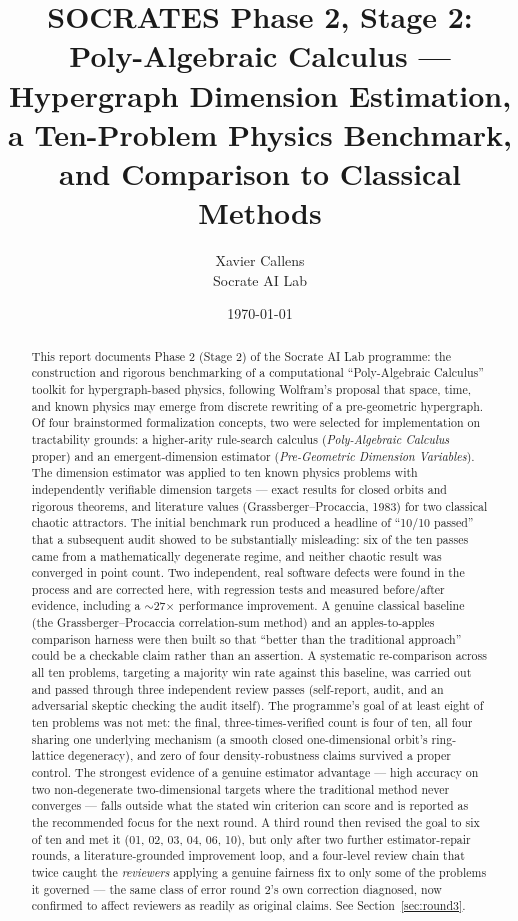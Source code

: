 \documentclass[11pt,a4paper]{article}
\title{\textbf{SOCRATES Phase 2, Stage 2:} \\
\large Poly-Algebraic Calculus --- Hypergraph Dimension Estimation, \\
a Ten-Problem Physics Benchmark, and Comparison to Classical Methods}
\author{Xavier Callens \\ Socrate AI Lab}
\date{\today}
\begin{document}
\maketitle

\begin{abstract}
This report documents Phase 2 (Stage 2) of the Socrate AI Lab programme:
the construction and rigorous benchmarking of a computational
``Poly-Algebraic Calculus'' toolkit for hypergraph-based physics, following
Wolfram's proposal that space, time, and known physics may emerge from
discrete rewriting of a pre-geometric hypergraph. Of four brainstormed
formalization concepts, two were selected for implementation on tractability
grounds: a higher-arity rule-search calculus (\emph{Poly-Algebraic
Calculus} proper) and an emergent-dimension estimator (\emph{Pre-Geometric
Dimension Variables}). The dimension estimator was applied to ten known
physics problems with independently verifiable dimension targets --- exact
results for closed orbits and rigorous theorems, and literature values
(Grassberger--Procaccia, 1983) for two classical chaotic attractors. The
initial benchmark run produced a headline of ``10/10 passed'' that a
subsequent audit showed to be substantially misleading: six of the ten
passes came from a mathematically degenerate regime, and neither chaotic
result was converged in point count. Two independent, real software defects
were found in the process and are corrected here, with regression tests and
measured before/after evidence, including a $\sim$27$\times$ performance
improvement. A genuine classical baseline (the Grassberger--Procaccia
correlation-sum method) and an apples-to-apples comparison harness were then
built so that ``better than the traditional approach'' could be a checkable
claim rather than an assertion. A systematic re-comparison across all ten
problems, targeting a majority win rate against this baseline, was carried
out and passed through three independent review passes (self-report,
audit, and an adversarial skeptic checking the audit itself). The
programme's goal of at least eight of ten problems was not met: the final,
three-times-verified count is four of ten, all four sharing one underlying
mechanism (a smooth closed one-dimensional orbit's ring-lattice
degeneracy), and zero of four density-robustness claims survived a proper
control. The strongest evidence of a genuine estimator advantage --- high
accuracy on two non-degenerate two-dimensional targets where the
traditional method never converges --- falls outside what the stated win
criterion can score and is reported as the recommended focus for the next
round. A third round then revised the goal to six of ten and met it (01,
02, 03, 04, 06, 10), but only after two further estimator-repair rounds, a
literature-grounded improvement loop, and a four-level review chain that
twice caught the \emph{reviewers} applying a genuine fairness fix to only
some of the problems it governed --- the same class of error round 2's own
correction diagnosed, now confirmed to affect reviewers as readily as
original claims. See Section~\ref{sec:round3}.
\end{abstract}
\end{document}

